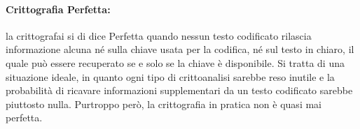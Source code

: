 \paragraph{Crittografia Perfetta: } la crittografai si di dice Perfetta quando
nessun
testo codificato rilascia informazione alcuna né
sulla chiave usata per la codifica, né sul testo in chiaro,
il quale può essere recuperato se e solo se
la chiave è disponibile.
Si tratta di una situazione ideale, in quanto ogni tipo di crittoanalisi sarebbe
reso inutile e la
probabilità di ricavare informazioni supplementari da un testo codificato
sarebbe piuttosto nulla.
Purtroppo però, la crittografia in pratica non è quasi mai perfetta.
